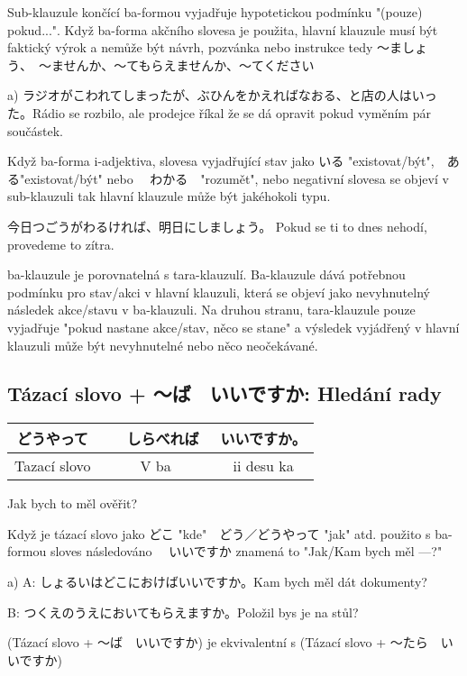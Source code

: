 Sub-klauzule končící ba-formou vyjadřuje hypotetickou podmínku "(pouze) pokud...". Když ba-forma akčního slovesa je použita, hlavní klauzule musí být faktický výrok a nemůže být návrh, pozvánka nebo instrukce tedy 〜ましょう、　〜ませんか、〜てもらえませんか、〜てください

a) ラジオがこわれてしまったが、ぶひんをかえればなおる、と店の人はいった。Rádio se rozbilo, ale prodejce říkal že se dá opravit pokud vyměním pár součástek.


Když ba-forma i-adjektiva, slovesa vyjadřující stav jako いる "existovat/být",　ある"existovat/být" nebo 　わかる　"rozumět", nebo negativní slovesa se objeví v sub-klauzuli tak hlavní klauzule může být jakéhokoli typu. 

今日つごうがわるければ、明日にしましょう。 Pokud se ti to dnes nehodí, provedeme to zítra.


ba-klauzule je porovnatelná s tara-klauzulí. Ba-klauzule dává potřebnou podmínku pro stav/akci v hlavní klauzuli, která se objeví jako nevyhnutelný následek akce/stavu v ba-klauzuli. Na druhou stranu, tara-klauzule pouze vyjadřuje "pokud nastane akce/stav, něco se stane" a výsledek vyjádřený v hlavní klauzuli může být nevyhnutelné nebo něco neočekávané.





\subsection{Tázací slovo + 〜ば　いいですか: Hledání rady}

\begin{center}
\begin{tabular}{||c||c|c||}
\hline
どうやって&　しらべれば　&いいですか。\\
\hline
Tazací slovo &V ba& ii desu ka\\
\hline
\end{tabular}
\end{center}
Jak bych to měl ověřit?

Když je tázací slovo jako どこ "kde"　どう／どうやって "jak" atd. použito s ba-formou sloves následováno 　いいですか znamená to "Jak/Kam bych měl ---?"

a)
A: しょるいはどこにおけばいいですか。Kam bych měl dát dokumenty?

B: つくえのうえにおいてもらえますか。Položil bys je na stůl?


(Tázací slovo + 〜ば　いいですか) je ekvivalentní s (Tázací slovo + 〜たら　いいですか)





